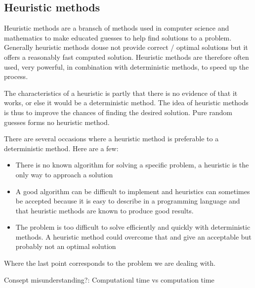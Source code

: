 \subsection{Heuristic methods}

Heuristic methods are a bransch of methods used in computer science and mathematics to make educated guesses to help find solutions to a problem. Generally heuristic methods douse not provide correct / optimal solutions but it offers a reasonably fast computed solution. Heuristic methods are therefore often used, very powerful, in combination with deterministic methods, to speed up the process.

The characteristics of a heuristic is partly that there is no evidence of that it works, or else it would be a deterministic method. The idea of heuristic methods is thus to improve the chances of finding the desired solution. Pure random guesses forms no heuristic method.

There are several occasions where a heuristic method is preferable to a deterministic method.
Here are a few:

\begin{itemize}
\item There is no known algorithm for solving a specific problem, a heuristic is the only way to approach a solution
\item A good algorithm can be difficult to implement and heuristics can sometimes be accepted because it is easy to describe in a programming language and that heuristic methods are known to produce good results.
\item The problem is too difficult to solve efficiently and quickly with deterministic methods. A heuristic method could overcome that and give an acceptable but probably not an optimal solution
\end{itemize}

Where the last point corresponds to the problem we are dealing with.

Consept misunderstanding?:
Computationl time vs computation time

